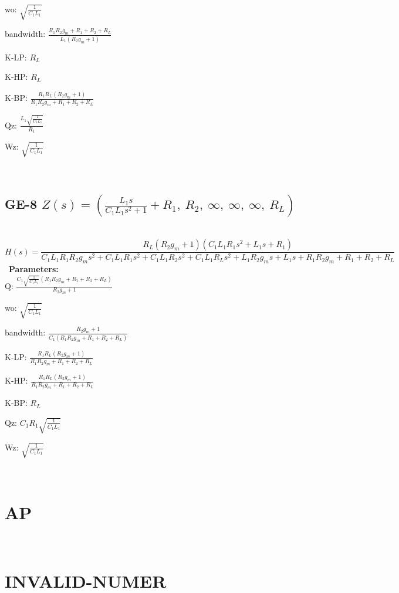 \documentclass{article}
\begin{document}
wo: $\sqrt{\frac{1}{C_{1} L_{1}}}$\ 

bandwidth: $\frac{R_{1} R_{2} g_{m} + R_{1} + R_{2} + R_{L}}{L_{1} \left(R_{2} g_{m} + 1\right)}$\ 

K-LP: $R_{L}$\ 

K-HP: $R_{L}$\ 

K-BP: $\frac{R_{1} R_{L} \left(R_{2} g_{m} + 1\right)}{R_{1} R_{2} g_{m} + R_{1} + R_{2} + R_{L}}$\ 

Qz: $\frac{L_{1} \sqrt{\frac{1}{C_{1} L_{1}}}}{R_{1}}$\ 

Wz: $\sqrt{\frac{1}{C_{1} L_{1}}}$\ 

\ 

\subsection{GE-8 $Z(s) = \left( \frac{L_{1} s}{C_{1} L_{1} s^{2} + 1} + R_{1}, \  R_{2}, \  \infty, \  \infty, \  \infty, \  R_{L}\right)$ } \ 
\textbf{\[H(s) = \frac{R_{L} \left(R_{2} g_{m} + 1\right) \left(C_{1} L_{1} R_{1} s^{2} + L_{1} s + R_{1}\right)}{C_{1} L_{1} R_{1} R_{2} g_{m} s^{2} + C_{1} L_{1} R_{1} s^{2} + C_{1} L_{1} R_{2} s^{2} + C_{1} L_{1} R_{L} s^{2} + L_{1} R_{2} g_{m} s + L_{1} s + R_{1} R_{2} g_{m} + R_{1} + R_{2} + R_{L}}\] } \ 
\textbf{Parameters:}\\ 

Q: $\frac{C_{1} \sqrt{\frac{1}{C_{1} L_{1}}} \left(R_{1} R_{2} g_{m} + R_{1} + R_{2} + R_{L}\right)}{R_{2} g_{m} + 1}$\ 

wo: $\sqrt{\frac{1}{C_{1} L_{1}}}$\ 

bandwidth: $\frac{R_{2} g_{m} + 1}{C_{1} \left(R_{1} R_{2} g_{m} + R_{1} + R_{2} + R_{L}\right)}$\ 

K-LP: $\frac{R_{1} R_{L} \left(R_{2} g_{m} + 1\right)}{R_{1} R_{2} g_{m} + R_{1} + R_{2} + R_{L}}$\ 

K-HP: $\frac{R_{1} R_{L} \left(R_{2} g_{m} + 1\right)}{R_{1} R_{2} g_{m} + R_{1} + R_{2} + R_{L}}$\ 

K-BP: $R_{L}$\ 

Qz: $C_{1} R_{1} \sqrt{\frac{1}{C_{1} L_{1}}}$\ 

Wz: $\sqrt{\frac{1}{C_{1} L_{1}}}$\ 

\ 

\section{AP}\ 
\section{INVALID-NUMER}\ 
\end{document}
